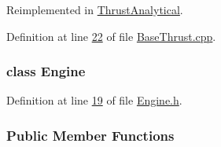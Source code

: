 Reimplemented in \hyperlink{group___engine_a3907d6febaf711a225c0abfe8022304f}{Thrust\+Analytical}.



Definition at line \hyperlink{_base_thrust_8cpp_source_l00022}{22} of file \hyperlink{_base_thrust_8cpp_source}{Base\+Thrust.\+cpp}.

\label{class_engine}
\subsubsection{class Engine}


Definition at line \hyperlink{_engine_8h_source_l00019}{19} of file \hyperlink{_engine_8h_source}{Engine.\+h}.

\subsubsection*{Public Member Functions}
